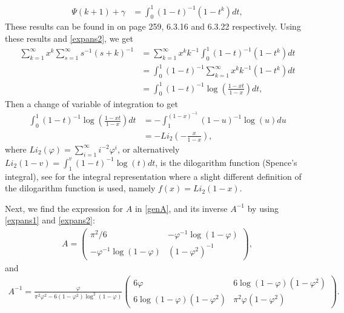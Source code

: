 {{\begin{align*}
     \Psi(k+1) + \gamma  &= \int_{0}^{1} (1-t)^{-1}(1-t^k) dt, 
\end{align*}
These results can be found in \textcite{abramowitz1964handbook} on page 259, 6.3.16 and 6.3.22 respectively. Using these results and \eqref{expans2}, we get
\begin{align*}
     \sum_{k = 1}^{\infty} x^k \sum_{s = 1}^{\infty} s^{-1} (s+k)^{-1} &=  \sum_{k = 1}^{\infty} x^k   k^{-1}  \int_{0}^{1} (1-t)^{-1}(1-t^k) dt \\
     &= \int_{0}^{1} (1-t)^{-1}\sum_{k = 1}^{\infty} x^k   k^{-1}  (1-t^k) dt \\
     &= \int_{0}^{1} (1-t)^{-1}\log\left( \frac{1-xt}{1-x} \right) dt, 
\end{align*}
Then a change of variable of integration to get 
\begin{align*}
    \int_{0}^{1} (1-t)^{-1}\log\left( \frac{1-xt}{1-x} \right) dt &= - \int_{1}^{(1-x)^{-1}} (1-u)^{-1} \log(u) du  \\
    &= - Li_2(-\frac{x}{1-x}),
\end{align*}
where $Li_{2}(\varphi) = \sum_{i = 1}^{\infty} i^{-2}\varphi^{i}$, or alternatively $Li_2(1-v) = \int_{1}^v (1-t)^{-1}\log(t) dt $, is the dilogarithm function (Spence's integral), see \textcite[page 1004, 27.7.1]{abramowitz1964handbook} for the integral representation where a slight different definition of the dilogarithm function is used, namely $f(x) = Li_{2}(1-x)$.

Next, we find the expression for $A$ in \eqref{genA}, and its inverse  $A^{-1}$ by using \eqref{expans1} and \eqref{expans2}: 
\begin{align*}
    A = \begin{pmatrix}
\pi^2/6 &  - \varphi^{-1} \log(1-\varphi) \\
 - \varphi^{-1} \log(1-\varphi)  &  (1-\varphi^2)^{-1}
\end{pmatrix} ,
\end{align*}
and 
\begin{align*}
    A^{-1} = \frac{\varphi}{\pi^2 \varphi^2 - 6 (1-\varphi^2)
    \log^2(1-\varphi)} \begin{pmatrix}
6 \varphi&  6 \log(1-\varphi) (1-\varphi^2) \\
6 \log(1-\varphi) (1-\varphi^2)   &  \pi^2 \varphi(1-\varphi^2)
\end{pmatrix}.  
\end{align*}

}}
